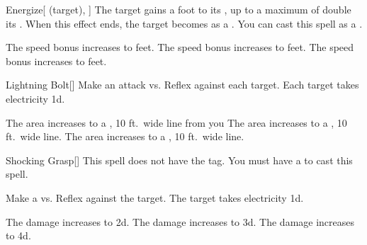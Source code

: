 \lowercase{\hypertarget{spell:Energize}{}}\label{spell:Energize}
\begin{attuneability}[Rank 1]{\hypertarget{spell:Energize}{Energize}}[ (target), ]
The target gains a  foot  to its , up to a maximum of double its .
When this effect ends, the target becomes  as a .
You can cast this spell as a .

\rankline
{} The speed bonus increases to  feet.
 The speed bonus increases to  feet.
 The speed bonus increases to  feet.
\end{attuneability}
\vspace{0.25em}



\lowercase{\hypertarget{spell:Lightning Bolt}{}}\label{spell:Lightning Bolt}
\begin{freeability}[Rank 1]{\hypertarget{spell:Lightning Bolt}{Lightning Bolt}}[]
Make an attack vs. Reflex against each target.
\hit Each target takes electricity  \minus1d.

\rankline
{} The area increases to a \arealarge, 10 ft.\ wide line from you
 The area increases to a \areahuge, 10 ft.\ wide line.
 The area increases to a \areaext, 10 ft.\ wide line.
\end{freeability}
\vspace{0.25em}



\lowercase{\hypertarget{spell:Shocking Grasp}{}}\label{spell:Shocking Grasp}
\begin{freeability}[Rank 1]{\hypertarget{spell:Shocking Grasp}{Shocking Grasp}}[]
This spell does not have the  tag.
You must have a  to cast this spell.

Make a  vs. Reflex against the target.
\hit The target takes electricity  \plus1d.

\rankline
{} The damage increases to  \plus2d.
 The damage increases to  \plus3d.
 The damage increases to  \plus4d.
\end{freeability}
\vspace{0.25em}



